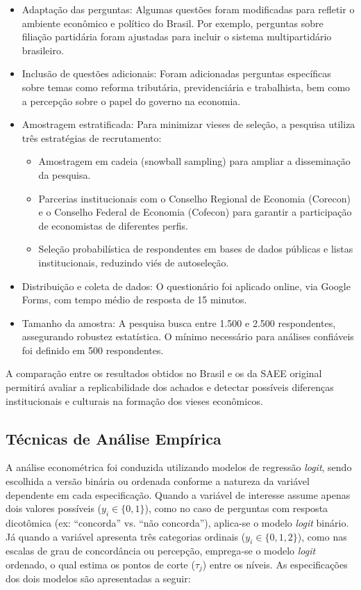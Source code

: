 \begin{itemize}
    \item Adaptação das perguntas: Algumas questões foram modificadas para refletir o ambiente econômico e político do Brasil. Por exemplo, perguntas sobre filiação partidária foram ajustadas para incluir o sistema multipartidário brasileiro.
    \item Inclusão de questões adicionais: Foram adicionadas perguntas específicas sobre temas como reforma tributária, previdenciária e trabalhista, bem como a percepção sobre o papel do governo na economia.
    \item Amostragem estratificada: Para minimizar vieses de seleção, a pesquisa utiliza três estratégias de recrutamento:
    \begin{itemize}
        \item Amostragem em cadeia (snowball sampling) para ampliar a disseminação da pesquisa.
        \item Parcerias institucionais com o Conselho Regional de Economia (Corecon) e o Conselho Federal de Economia (Cofecon) para garantir a participação de economistas de diferentes perfis.
        \item Seleção probabilística de respondentes em bases de dados públicas e listas institucionais, reduzindo viés de autoseleção.
    \end{itemize}
    \item Distribuição e coleta de dados: O questionário foi aplicado online, via Google Forms, com tempo médio de resposta de 15 minutos.
    \item Tamanho da amostra: A pesquisa busca entre 1.500 e 2.500 respondentes, assegurando robustez estatística. O mínimo necessário para análises confiáveis foi definido em 500 respondentes.
\end{itemize}

A comparação entre os resultados obtidos no Brasil e os da SAEE original permitirá avaliar a replicabilidade dos achados e detectar possíveis diferenças institucionais e culturais na formação dos vieses econômicos.

\subsection{Técnicas de Análise Empírica}

A análise econométrica foi conduzida utilizando modelos de regressão \textit{logit}, sendo escolhida a versão binária ou ordenada conforme a natureza da variável dependente em cada especificação. Quando a variável de interesse assume apenas dois valores possíveis (\( y_i \in \{0,1\} \)), como no caso de perguntas com resposta dicotômica (ex: ``concorda'' vs. ``não concorda''), aplica-se o modelo \textit{logit} binário. Já quando a variável apresenta três categorias ordinais (\( y_i \in \{0,1,2\} \)), como nas escalas de grau de concordância ou percepção, emprega-se o modelo \textit{logit} ordenado, o qual estima os pontos de corte (\( \tau_j \)) entre os níveis. As especificações dos dois modelos são apresentadas a seguir:


